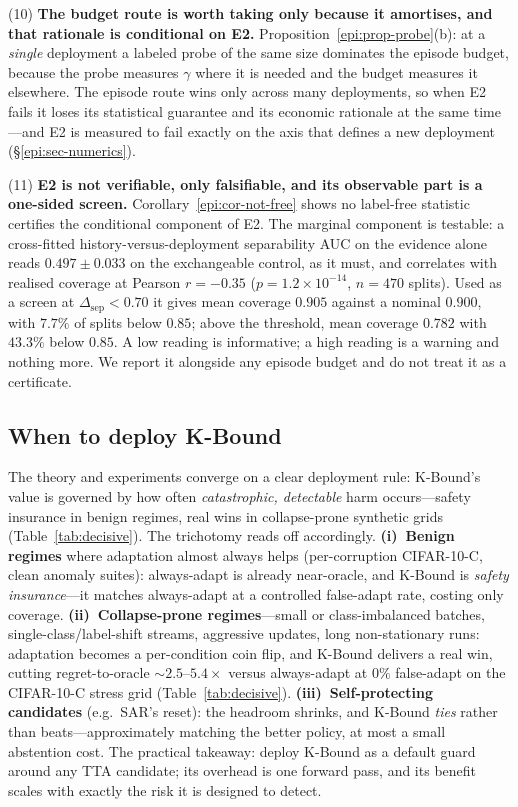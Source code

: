 \documentclass[conference]{IEEEtran}
\theoremstyle{plain}
\theoremstyle{definition}
\begin{document}
(10) \textbf{The budget route is worth taking only because it amortises, and that rationale is
conditional on E2.} Proposition~\ref{epi:prop-probe}(b): at a \emph{single} deployment a labeled
probe of the same size dominates the episode budget, because the probe measures $\gamma$ where it is
needed and the budget measures it elsewhere. The episode route wins only across many deployments, so
when E2 fails it loses its statistical guarantee and its economic rationale at the same time---and
E2 is measured to fail exactly on the axis that defines a new deployment
(\S\ref{epi:sec-numerics}).

(11) \textbf{E2 is not verifiable, only falsifiable, and its observable part is a one-sided screen.}
Corollary~\ref{epi:cor-not-free} shows no label-free statistic certifies the conditional component
of E2. The marginal component is testable: a cross-fitted history-versus-deployment separability
AUC on the evidence alone reads $0.497\pm0.033$ on the exchangeable control, as it must, and
correlates with realised coverage at Pearson $r=-0.35$ ($p=1.2\times10^{-14}$, $n=470$ splits).
Used as a screen at $\Delta_{\mathrm{sep}}<0.70$ it gives mean coverage $0.905$ against a nominal
$0.900$, with $7.7\%$ of splits below $0.85$; above the threshold, mean coverage $0.782$ with $43.3\%$ below $0.85$. A low
reading is informative; a high reading is a warning and nothing more. We report it alongside any
episode budget and do not treat it as a certificate.

\subsection{When to deploy K-Bound}\label{sec:discussion}
\begin{sloppypar}
The theory and experiments converge on a clear deployment rule: K-Bound's value is governed by how
often \emph{catastrophic, detectable} harm occurs---safety insurance in benign regimes, real wins in
collapse-prone synthetic grids (Table~\ref{tab:decisive}).
The trichotomy reads off accordingly. \textbf{(i)~Benign regimes} where adaptation
almost always helps (per-corruption CIFAR-10-C, clean anomaly suites): always-adapt is already
near-oracle, and K-Bound is \emph{safety insurance}---it matches always-adapt at a controlled
false-adapt rate, costing only coverage. \textbf{(ii)~Collapse-prone regimes}---small or
class-imbalanced batches, single-class/label-shift streams, aggressive updates, long
non-stationary runs: adaptation becomes a per-condition coin flip, and K-Bound delivers a real
win, cutting regret-to-oracle $\sim$$2.5$--$5.4\times$ versus always-adapt at $0\%$ false-adapt
on the CIFAR-10-C stress grid (Table~\ref{tab:decisive}). \textbf{(iii)~Self-protecting
candidates} (e.g.\ SAR's reset): the headroom shrinks, and K-Bound \emph{ties} rather than
beats---approximately matching the better policy, at most a small abstention cost. The practical takeaway: deploy K-Bound as a default guard around
any TTA candidate; its overhead is one forward pass, and its benefit scales with exactly the
risk it is designed to detect.
\end{sloppypar}
\end{document}
